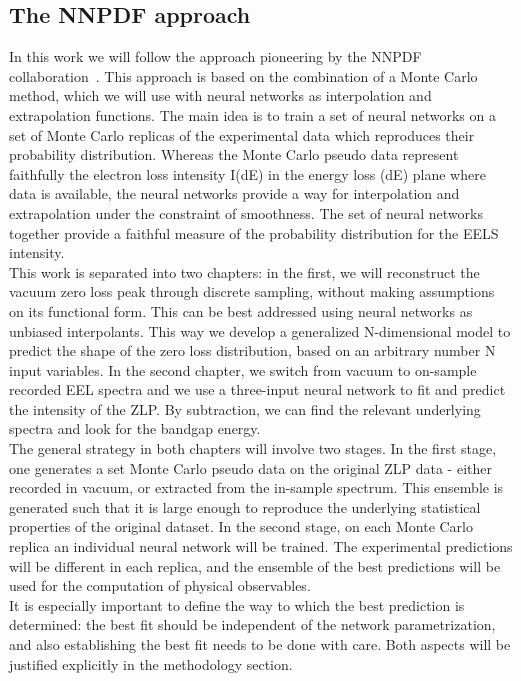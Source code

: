 \documentclass[11pt,a4paper]{article}
\numberwithin{equation}{section}
\numberwithin{figure}{section}
\numberwithin{table}{section}
\begin{document}
\subsection{The NNPDF approach}
In this work we will follow the approach pioneering by the NNPDF collaboration~\cite{Ball:2017}. This approach is based on the combination of a Monte Carlo method, which we will use with neural networks as interpolation and extrapolation functions. The main idea is to train a set of neural networks on a set of Monte Carlo replicas of the experimental data which reproduces their probability distribution. Whereas the Monte Carlo pseudo data represent faithfully the electron loss intensity I(dE) in the energy loss (dE) plane where data is available, the neural networks provide a way for interpolation and extrapolation under the constraint of smoothness. The set of neural networks together provide a faithful measure of the probability distribution for the EELS intensity. \\
This work is separated into two chapters: in the first, we will reconstruct the vacuum zero loss peak through discrete sampling, without making assumptions on its functional form. This can be best addressed using neural networks as unbiased interpolants. This way we develop a generalized N-dimensional model to predict the shape of the zero loss distribution, based on an arbitrary number N input variables. 
In the second chapter, we switch from vacuum to on-sample recorded EEL spectra and we use a three-input neural network to fit and predict the intensity of the ZLP. By subtraction, we can find the relevant underlying spectra and look for the bandgap energy.\\
The general strategy in both chapters will involve two stages. In the first stage, one generates a set Monte Carlo pseudo data on the original ZLP data - either recorded in vacuum, or extracted from the in-sample spectrum. This ensemble is generated such that it is large enough to reproduce the underlying statistical properties of the original dataset. In the second stage, on each Monte Carlo replica an individual neural network will be trained. The experimental predictions will be different in each replica, and the ensemble of the best predictions will be used for the computation of physical observables.\\
It is especially important to define the way to which the best prediction is determined: the best fit should be independent of the network parametrization, and also establishing the best fit needs to be done with care. Both aspects will be justified explicitly in the methodology section. \\
\end{document}
